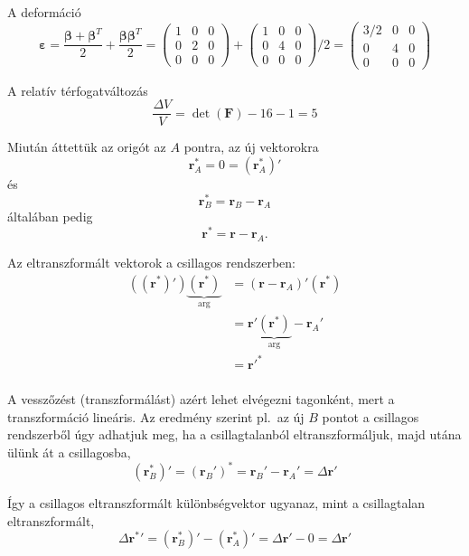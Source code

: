 \documentclass[12pt,a4paper]{scrartcl}
\let\mathbf\bm
\begin{document}
A deformáció
\[{\mathbf{\varepsilon }} = \frac{{{\mathbf{\beta }} + {{\mathbf{\beta }}^T}}}{2} + \frac{{{\mathbf{\beta }}{{\mathbf{\beta }}^T}}}{2} = \left( {\begin{array}{*{20}{c}}
  1&0&0 \\ 
  0&2&0 \\ 
  0&0&0 
\end{array}} \right) + \left( {\begin{array}{*{20}{c}}
  1&0&0 \\ 
  0&4&0 \\ 
  0&0&0 
\end{array}} \right)/2 = \left( {\begin{array}{*{20}{c}}
  {3/2}&0&0 \\ 
  0&4&0 \\ 
  0&0&0 
\end{array}} \right)\]

A relatív térfogatváltozás
\[\frac{{\Delta V}}{V} = \det \left( {\mathbf{F}} \right) - 16 - 1 = 5\]

Miután áttettük az origót az $A$ pontra, az új vektorokra
\[{\mathbf{r}}_A^* = 0 = \left( {{\mathbf{r}}_A^ * } \right)'\]
és
\[{\mathbf{r}}_B^ *  = {{\mathbf{r}}_B} - {{\mathbf{r}}_A}\]
általában pedig
\[{{\mathbf{r}}^ * } = {\mathbf{r}} - {{\mathbf{r}}_A}.\]

Az eltranszformált vektorok a csillagos rendszerben:
\[\begin{aligned}
  \left( {\left( {{{\mathbf{r}}^ * }} \right)'} \right)\underbrace {\left( {{{\mathbf{r}}^ * }} \right)}_{{\text{arg}}} &  = \left( {{\mathbf{r}} - {{\mathbf{r}}_A}} \right)'\left( {{{\mathbf{r}}^ * }} \right) \\ 
   &  = {\mathbf{r}}'\underbrace {\left( {{{\mathbf{r}}^ * }} \right)}_{{\text{arg}}} - {{\mathbf{r}}_A}' \\ 
   &  = {\mathbf{r}}{'^ * } \\ 
\end{aligned} \]

A vesszőzést (transzformálást) azért lehet elvégezni tagonként, mert a transzformáció lineáris. Az eredmény szerint pl.\ az új $B$ pontot a csillagos rendszerből úgy adhatjuk meg, ha a csillagtalanból eltranszformáljuk, majd utána ülünk át a csillagosba,
\[\left( {{\mathbf{r}}_B^ * } \right)' = {\left( {{{\mathbf{r}}_B}'} \right)^*} = {{\mathbf{r}}_B}' - {{\mathbf{r}}_A}' = \Delta {\mathbf{r}}'\]

Így a csillagos eltranszformált különbségvektor ugyanaz, mint a csillagtalan eltranszformált,
\[\Delta {{\mathbf{r}}^ * }' = \left( {{\mathbf{r}}_B^ * } \right)' - \left( {{\mathbf{r}}_A^ * } \right)' = \Delta {\mathbf{r}}' - 0 = \Delta {\mathbf{r}}'\]
\end{document}
